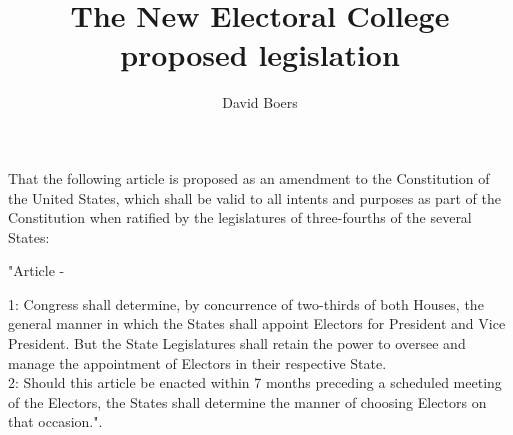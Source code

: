 \documentclass{article}
\title{The New Electoral College proposed legislation}
\author{David Boers}
\begin{document}
    \subject{To propose an Amendment to the Constitution of the United States to modify the Electoral College and for other purposes.}
    That the following article is proposed as an amendment to the Constitution of the United States, which shall be valid to all intents and purposes as part of the Constitution when ratified by the legislatures of three-fourths of the several States:\\
    \begin{center}"Article -\end{center}
    1: Congress shall determine, by concurrence of two-thirds of both Houses, the general manner in which the States shall 
        appoint Electors for President and Vice President. But the State Legislatures shall retain the power to oversee and manage the appointment of 
        Electors in their respective State.\\
    2: Should this article be enacted within 7 months preceding a scheduled meeting of the Electors, the States shall determine the manner of choosing 
        Electors on that occasion.".\\
\end{document}
